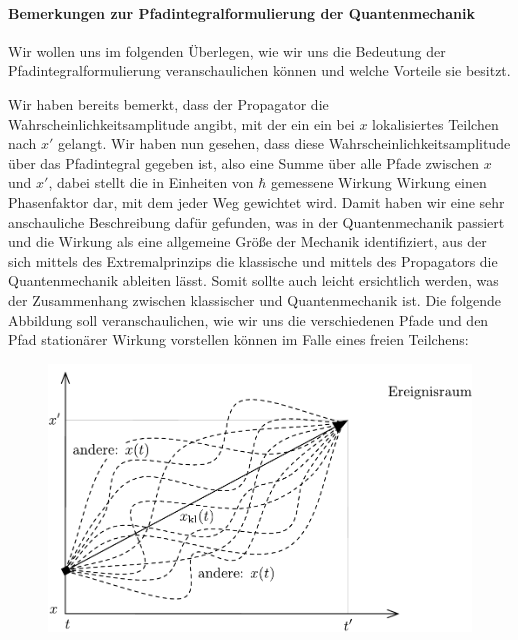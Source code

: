 \paragraph{Bemerkungen zur Pfadintegralformulierung der Quantenmechanik}

Wir wollen uns im folgenden Überlegen, wie wir uns die Bedeutung der Pfadintegralformulierung veranschaulichen können und welche Vorteile sie besitzt. 

Wir haben bereits bemerkt, dass der Propagator die Wahrscheinlichkeitsamplitude angibt, mit der ein ein bei $x$ lokalisiertes Teilchen nach $x'$ gelangt. Wir haben nun gesehen, dass diese Wahrscheinlichkeitsamplitude über das Pfadintegral gegeben ist, also eine Summe über alle Pfade zwischen $x$ und $x'$, dabei stellt die in Einheiten von $\hbar$ gemessene Wirkung Wirkung einen Phasenfaktor dar, mit dem jeder Weg gewichtet wird. Damit haben wir eine sehr anschauliche Beschreibung dafür gefunden, was in der Quantenmechanik passiert und die Wirkung als eine allgemeine Größe der Mechanik identifiziert, aus der sich mittels des Extremalprinzips die klassische und mittels des Propagators die Quantenmechanik ableiten lässt. Somit sollte auch leicht ersichtlich werden, was der Zusammenhang zwischen klassischer und Quantenmechanik ist. Die folgende Abbildung soll veranschaulichen, wie wir uns die verschiedenen Pfade und den Pfad stationärer Wirkung vorstellen können im Falle eines freien Teilchens:  
\begin{figure}[h!]\centering
\includegraphics[scale=.75]{Figs/Pfade}
\end{figure}\vspace{-4ex}

